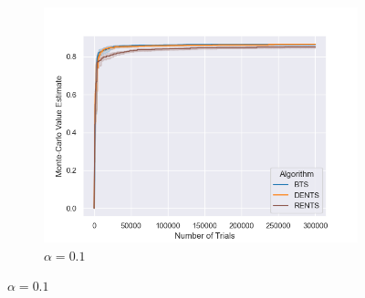 \begin{figure}
\begin{subfigure}[b]{0.32\textwidth}
                \end{subfigure}
                \begin{subfigure}[b]{0.32\textwidth}
                    \centering
                    \includegraphics[width=\textwidth]{figures/temp/fl_sens/055_fl8_0_1_02.png}
                    \caption{$\alpha=0.1$}
                \end{subfigure}
                

\end{figure}
